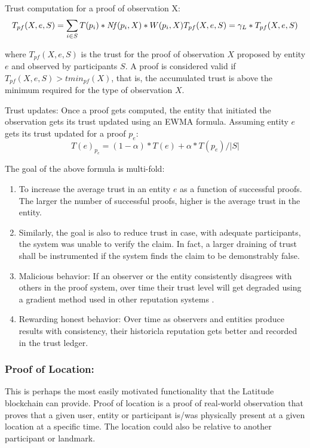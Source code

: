 \noindent
Trust computation for a proof of observation X:
\begin{equation*}
    \label{eq_trust_compute}
    T_{pf}(X, e, S) = \sum_{i\in S} T(p_i) * \mathit{Nf}(p_i, X) * W(p_i, X)
    T_{pf}(X, e, S) = \gamma_L * T_{pf}(X, e, S)
\end{equation*}

where $T_{pf}(X, e, S)$ is the trust for the proof of observation $X$ proposed by entity $e$ and observed by
participants $S$. A proof is considered valid if $T_{pf}(X, e, S) > tmin_{pf}(X)$, that is, the accumulated trust is
above the minimum required for the type of observation $X$.

\noindent
Trust updates: Once a proof gets computed, the entity that initiated the observation gets its trust updated using an
EWMA formula. Assuming entity $e$ gets its trust updated for a proof $p_e$:
\begin{equation*}
    T(e)_{p_e} = (1 - \alpha) * T(e) + \alpha * T(p_e) / |S|
\end{equation*}

The goal of the above formula is multi-fold:
\begin{enumerate}
    \item To increase the average trust in an entity $e$ as a function of successful proofs. The larger the number of
        successful proofs, higher is the average trust in the entity.
    \item Similarly, the goal is also to reduce trust in case, with adequate participants, the system was unable to
        verify the claim. In fact, a larger draining of trust shall be instrumented if the system finds the claim to be
        demonstrably false.
    \item Malicious behavior: If an observer or the entity consistently disagrees with others in the proof system,
        over time their trust level will get degraded using a gradient method used in other reputation systems
        \cite{sen2010}.
    \item Rewarding honest behavior: Over time as observers and entities produce results with consistency, their
        historicla reputation gets better and recorded in the trust ledger.
\end{enumerate}

\subsubsection{Proof of Location:}

This is perhaps the most easily motivated functionality that the Latitude blockchain can provide. Proof of location is a
proof of real-world observation that proves that a given user, entity or participant is/was physically present at a given
location at a specific time. The location could also be relative to another participant or landmark.

